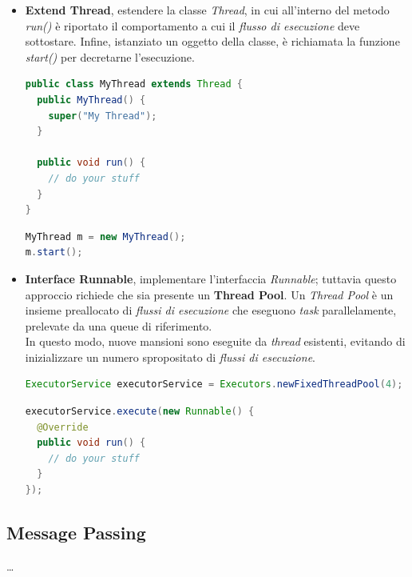 \documentclass{article}
\begin{document}
\begin{itemize}[label={-}]
  \itemsep0em
  \item \textbf{Extend Thread}, estendere la classe \textit{Thread}, in cui all'interno del metodo \textit{run()} è riportato il comportamento a cui il \textit{flusso di esecuzione} deve sottostare. Infine, istanziato un oggetto della classe, è richiamata la funzione \textit{start()} per decretarne l'esecuzione.  
  \begin{lstlisting}[language=JAVA]
public class MyThread extends Thread {
  public MyThread() {
    super("My Thread");
  }

  public void run() {
    // do your stuff
  }
}
\end{lstlisting}
\begin{lstlisting}[language=JAVA]
MyThread m = new MyThread();
m.start();
\end{lstlisting}
  \item \textbf{Interface Runnable}, implementare l'interfaccia \textit{Runnable}; tuttavia questo approccio richiede che sia presente un \textbf{Thread Pool}. Un \textit{Thread Pool} è un insieme preallocato di \textit{flussi di esecuzione} che eseguono \textit{task} parallelamente, prelevate da una queue di riferimento.\vspace*{7pt}\\
  In questo modo, nuove mansioni sono eseguite da \textit{thread} esistenti, evitando di inizializzare un numero spropositato di \textit{flussi di esecuzione}.
  \begin{lstlisting}[language=JAVA]
ExecutorService executorService = Executors.newFixedThreadPool(4);
  \end{lstlisting}
\begin{lstlisting}[language=JAVA]
executorService.execute(new Runnable() {
  @Override
  public void run() {
    // do your stuff
  }
});
\end{lstlisting}
\end{itemize}

\subsection*{Message Passing}
\dots
\end{document}
